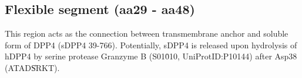 \subsection{Flexible segment (aa29 - aa48)}

This region acts as the connection between transmembrane anchor and soluble form of DPP4 (sDPP4 39-766). Potentially, sDPP4 is released upon hydrolysis of hDPP4 by serine protease Granzyme B (S01\.010, UniProtID:P10144) after Asp38 (ATAD\|SRKT).~\cite{Song_2018} 
